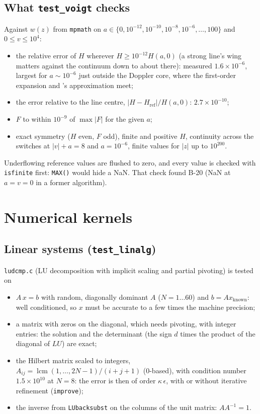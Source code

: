 \documentclass[11pt,a4paper]{article}
\newcommand{\code}[1]{\texttt{#1}}
\begin{document}
\subsection{What \code{test\_voigt} checks}
Against $w(z)$ from \code{mpmath} on $a\in\{0,10^{-12},10^{-10},
10^{-8},10^{-6},\ldots,100\}$ and $0\le v\le 10^4$:
\begin{itemize}
\item the relative error of $H$ wherever $H\ge 10^{-12}H(a,0)$ (a strong
  line's wing matters against the continuum down to about there):
  measured $1.6\times10^{-6}$, largest for $a\sim10^{-6}$ just outside
  the Doppler core, where the first-order expansion and \citeauthor{10.1137/0731077}'s
  approximation meet;
\item the error relative to the line centre, $|H-H_\text{ref}|/H(a,0)$:
  $2.7\times10^{-10}$;
\item $F$ to within $10^{-9}$ of $\max|F|$ for the given $a$;
\item exact symmetry ($H$ even, $F$ odd), finite and positive $H$,
  continuity across the switches at $|v|+a=8$ and $a=10^{-6}$, finite
  values for $|z|$ up to $10^{200}$.
\end{itemize}
Underflowing reference values are flushed to zero, and every value is
checked with \code{isfinite} first: \code{MAX()} would hide a NaN. That
check found B-20 (NaN at $a=v=0$ in a former algorithm).

\section{Numerical kernels}

\subsection{Linear systems (\code{test\_linalg})}
\code{ludcmp.c} (LU decomposition with implicit scaling and partial
pivoting) is tested on
\begin{itemize}
\item $A\,x = b$ with random, diagonally dominant $A$ ($N=1\ldots60$)
  and $b = Ax_\text{known}$: well conditioned, so $x$ must be accurate
  to a few times the machine precision;
\item a matrix with zeros on the diagonal, which needs pivoting, with
  integer entries: the solution and the determinant (the sign $d$ times
  the product of the diagonal of $LU$) are exact;
\item the Hilbert matrix scaled to integers,
  $A_{ij} = \operatorname{lcm}(1,\ldots,2N-1)/(i+j+1)$ ($0$-based), with
  condition number $1.5\times10^{10}$ at $N=8$: the error is then of
  order $\kappa\,\epsilon$, with or without iterative refinement
  (\code{improve});
\item the inverse from \code{LUbacksubst} on the columns of the unit
  matrix: $AA^{-1}=1$.
\end{itemize}
\end{document}
